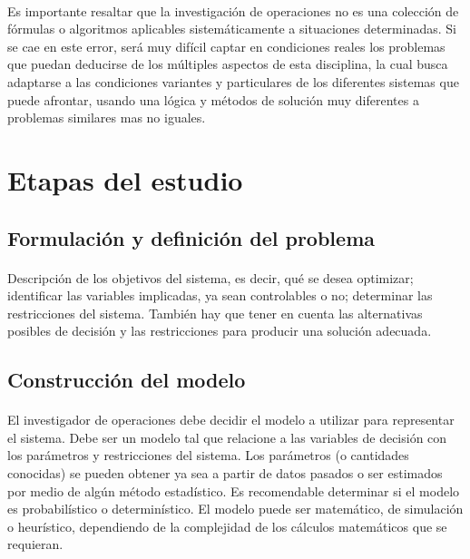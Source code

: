 \documentclass[12pt, a4paper,spanish]{article}
\begin{document}
		\paragraph{}
		Es importante resaltar que la investigación de operaciones no es una colección de fórmulas o algoritmos aplicables sistemáticamente a situaciones determinadas. Si se cae en este error, será muy difícil captar en condiciones reales los problemas que puedan deducirse de los múltiples aspectos de esta disciplina, la cual busca adaptarse a las condiciones variantes y particulares de los diferentes sistemas que puede afrontar, usando una lógica y métodos de solución muy diferentes a problemas similares mas no iguales.\cite{wikipedia_IO}

	\section{Etapas del estudio}
		\paragraph{}

		\subsection{Formulación y definición del problema}

			\paragraph{}
			Descripción de los objetivos del sistema, es decir, qué se desea optimizar; identificar las variables implicadas, ya sean controlables o no; determinar las restricciones del sistema. También hay que tener en cuenta las alternativas posibles de decisión y las restricciones para producir una solución adecuada.\cite{invdeop_IO}

		\subsection{Construcción del modelo}

			\paragraph{}
			El investigador de operaciones debe decidir el modelo a utilizar para representar el sistema. Debe ser un modelo tal que relacione a las variables de decisión con los parámetros y restricciones del sistema. Los parámetros (o cantidades conocidas) se pueden obtener ya sea a partir de datos pasados o ser estimados por medio de algún método estadístico. Es recomendable determinar si el modelo es probabilístico o determinístico. El modelo puede ser matemático, de simulación o heurístico, dependiendo de la complejidad de los cálculos matemáticos que se requieran.\cite{invdeop_IO}
\end{document}

